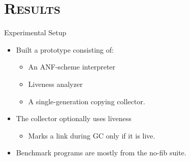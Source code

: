 \documentclass[xcolor=x11names,compress,mathserif]{beamer}
\renewcommand{\(}{\begin{columns}}
\renewcommand{\)}{\end{columns}}
\newcommand{\<}[1]{\begin{column}{#1}}
\renewcommand{\>}{\end{column}}
\begin{document}

\section{\scshape Results}
\begin{frame}{Experimental Setup}
  \begin{itemize}\itemsep1em
  \item Built a prototype consisting of:
    \begin{itemize}
    \item An ANF-scheme interpreter
    \item Liveness analyzer
    \item A single-generation copying collector.
     \end{itemize}
  \item The collector optionally uses liveness
    \begin{itemize}
    \item Marks a link during GC only if it is live.
    \end{itemize}
  \item Benchmark programs are mostly from the no-fib suite. 
  \end{itemize}

\end{frame}
\end{document}
